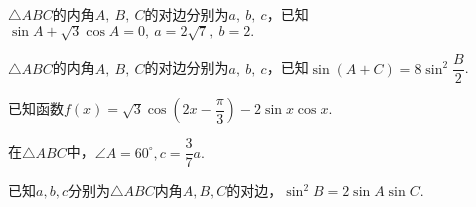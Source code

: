 \documentclass{BHCexam}
\begin{document}
\begin{questions}
\newpage
\qs $\triangle ABC$的内角$ A,~B,~C $的对边分别为$ a,~b,~c $，已知$ \sin A+\sqrt{3}\cos A =0,~a=2\sqrt{7},~b=2.$
\kongbai
\qs $\triangle ABC$的内角$ A,~B,~C $的对边分别为$ a,~b,~c $，已知$ \sin\left(A+C\right) =8\sin^2\dfrac{B}{2}$.
\kongbai
\qs 已知函数$f(x)=\sqrt{3}\cos\left(2x-\dfrac{\pi}{3}\right)-2\sin x\cos x$.
\kongbai
\qs 在$\triangle ABC$中，$ \angle A=60^{\circ},c=\dfrac{3}{7}a. $
\kongbai
\qs 已知$a,b,c$分别为$\triangle ABC$内角$A,B,C$的对边，$\sin^2B=2\sin A\sin C$.
\begin{parts}

\end{parts}
\end{questions}
\end{document}
